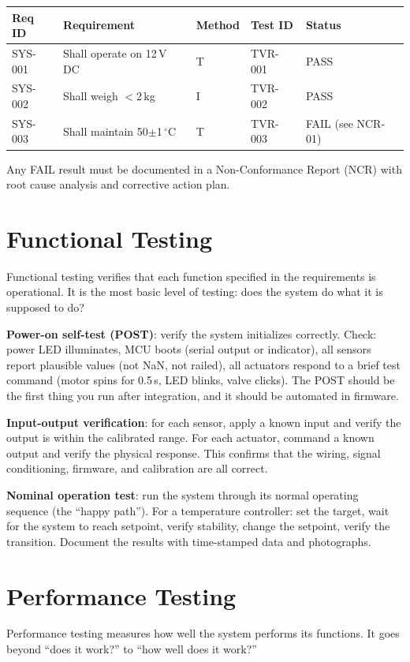 \documentclass[11pt,letterpaper,twoside,openany]{book}
\newcommand{\degC}{\ensuremath{{}^{\circ}\text{C}}}
\begin{document}
\begin{greenshieldbox}
\begin{tabularx}{\textwidth}{l l l l l}
\toprule
\textbf{Req ID} & \textbf{Requirement} & \textbf{Method} & \textbf{Test ID} & \textbf{Status} \\
\midrule
SYS-001 & Shall operate on 12\,V DC & T & TVR-001 & PASS \\
SYS-002 & Shall weigh $<$2\,kg & I & TVR-002 & PASS \\
SYS-003 & Shall maintain 50$\pm$1\,\degC{} & T & TVR-003 & FAIL (see NCR-01) \\
\bottomrule
\end{tabularx}
Any FAIL result must be documented in a Non-Conformance Report (NCR) with root cause analysis and corrective action plan.
\end{greenshieldbox}

\section{Functional Testing}
Functional testing verifies that each function specified in the requirements is operational. It is the most basic level of testing: does the system do what it is supposed to do?

\textbf{Power-on self-test (POST)}: verify the system initializes correctly. Check: power LED illuminates, MCU boots (serial output or indicator), all sensors report plausible values (not NaN, not railed), all actuators respond to a brief test command (motor spins for 0.5\,s, LED blinks, valve clicks). The POST should be the first thing you run after integration, and it should be automated in firmware.

\textbf{Input-output verification}: for each sensor, apply a known input and verify the output is within the calibrated range. For each actuator, command a known output and verify the physical response. This confirms that the wiring, signal conditioning, firmware, and calibration are all correct.

\textbf{Nominal operation test}: run the system through its normal operating sequence (the ``happy path''). For a temperature controller: set the target, wait for the system to reach setpoint, verify stability, change the setpoint, verify the transition. Document the results with time-stamped data and photographs.

\section{Performance Testing}
Performance testing measures how well the system performs its functions. It goes beyond ``does it work?'' to ``how well does it work?''
\end{document}

